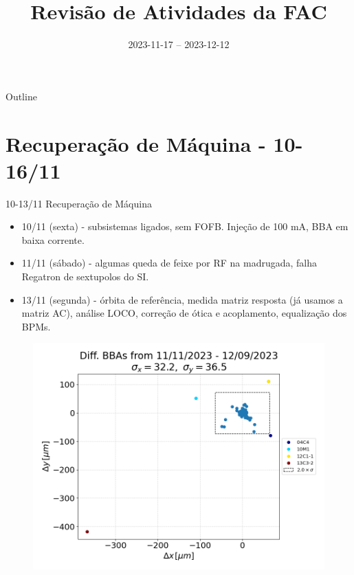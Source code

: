 \documentclass{beamer}					  %
\title{Revisão de Atividades da FAC}	%
\institute{LNLS.DAC.FAC}				%
\date{2023-11-17 -- 2023-12-12}			%
\begin{document}
\begin{frame}
  \titlepage
  \href{https://github.com/lnls-fac/doc-review-dac-fac}{}
  \href{https://www.overleaf.com/read/sbdjxtzfchrm}{}
\end{frame}

\begin{frame}{Outline}
  \tableofcontents
\end{frame}


\section{Recuperação de Máquina - 10-16/11}

\begin{frame}{10-13/11 Recuperação de Máquina}
    \begin{minipage}{0.4\textwidth}
        \scriptsize{
        \begin{itemize}
    		\item 10/11 (sexta) - subsistemas ligados, sem FOFB. Injeção de 100 mA, BBA em baixa corrente.
            \item 11/11 (sábado) - algumas queda de feixe por RF na madrugada, falha Regatron de sextupolos do SI.
            \item 13/11 (segunda) - órbita de referência, medida matriz resposta (já usamos a matriz AC), análise LOCO, correção de ótica e acoplamento, equalização dos BPMs.
        \end{itemize}}
    \end{minipage}
    \begin{minipage}{0.58\textwidth}
        \captionsetup[figure]{font=tiny}
        \begin{figure}[H]
        	\centering
            \includegraphics[width=1\textwidth]{2023-12-12/figures/diff_to_bba_after_september23_shutdown.png}

\end{figure}
\end{minipage}
\end{frame}
\end{document}
